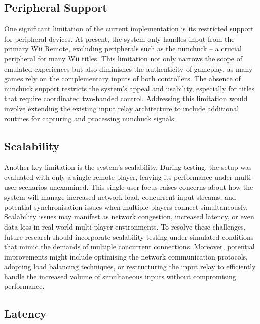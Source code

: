 \subsection{Peripheral Support}

One significant limitation of the current implementation is its restricted
support for peripheral devices. At present, the system only handles input from
the primary Wii Remote, excluding peripherals such as the nunchuck -- a crucial peripheral for many Wii
titles. This limitation not only narrows the scope of emulated experiences but
also diminishes the authenticity of gameplay, as many games rely on the
complementary inputs of both controllers. The absence of nunchuck support
restricts the system’s appeal and usability, especially for titles that require
coordinated two-handed control. Addressing this limitation would involve extending
the existing input relay architecture to include additional routines for
capturing and processing nunchuck signals.

\subsection{Scalability}

Another key limitation is the system’s scalability. During testing, the setup
was evaluated with only a single remote player, leaving its performance under
multi-user scenarios unexamined. This single-user focus raises concerns about
how the system will manage increased network load, concurrent input streams, and
potential synchronisation issues when multiple players connect simultaneously.
Scalability issues may manifest as network congestion, increased latency, or
even data loss in real-world multi-player environments. To resolve these
challenges, future research should incorporate scalability testing under
simulated conditions that mimic the demands of multiple concurrent connections.
Moreover, potential improvements might include optimising the network
communication protocols, adopting load balancing techniques, or restructuring
the input relay to efficiently handle the increased volume of simultaneous
inputs without compromising performance.

\subsection{Latency}

